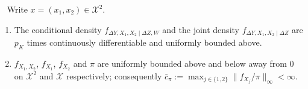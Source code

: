 \begin{assumption}[C1: Densities]\label{ass:app1}~
Write $x=(x_1,x_2)\in\mathcal X^{2}$.
\begin{enumerate}
\item[(i)] The conditional density $f_{\Delta Y,X_1,X_2\mid\Delta Z,W}$ and the joint density
$f_{\Delta Y,X_1,X_2\mid\Delta Z}$ are $p_K$ times continuously differentiable and uniformly bounded
above.
\item[(ii)] $f_{X_1,X_2}$, $f_{X_1}$, $f_{X_2}$ and $\pi$ are uniformly bounded above and below away
from $0$ on $\mathcal X^{2}$ and $\mathcal X$ respectively; consequently
$\bar c_\pi:=\max_{j\in\{1,2\}}\|f_{X_j}/\pi\|_\infty<\infty$.
\end{enumerate}
\end{assumption}

